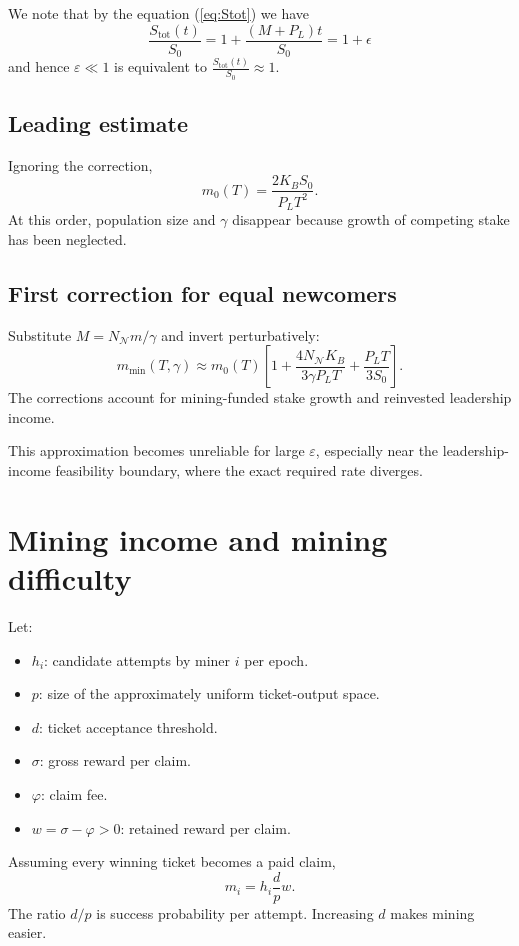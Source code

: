 \documentclass[11pt,a4paper]{article}
\begin{document}
We note that by the equation  (\ref{eq:Stot}) we have 
%
\begin{equation}
\frac{S_{\mathrm{tot}}(t)}{S_0}=1+\frac{(M+P_L)t}{S_0}=1+\epsilon
\end{equation}
%
and hence $\varepsilon\ll1$ is equivalent to $\frac{S_{\mathrm{tot}}(t)}{S_0}\approx1$.


\subsection*{Leading estimate}
Ignoring the correction,
\begin{equation}
\boxed{m_0(T)=\frac{2K_BS_0}{P_LT^2}.}
\end{equation}
At this order, population size and $\gamma$ disappear because growth of competing stake has been neglected.

\subsection*{First correction for equal newcomers}
Substitute $M=N_{\mathcal N}m/\gamma$ and invert perturbatively:
\begin{equation}
\boxed{m_{\min}(T,\gamma)\approx m_0(T)\left[1+\frac{4N_{\mathcal N}K_B}{3\gamma P_LT}+\frac{P_LT}{3S_0}\right].}
\end{equation}
The corrections account for mining-funded stake growth and reinvested leadership income.

This approximation becomes unreliable for large $\varepsilon$, especially near the leadership-income feasibility boundary, where the exact required rate diverges.

\section{Mining income and mining difficulty}\label{sec:difficulty}
Let:
\begin{itemize}
\item $h_i$: candidate attempts by miner $i$ per epoch.
\item $p$: size of the approximately uniform ticket-output space.
\item $d$: ticket acceptance threshold.
\item $\sigma$: gross reward per claim.
\item $\varphi$: claim fee.
\item $w=\sigma-\varphi>0$: retained reward per claim.
\end{itemize}
Assuming every winning ticket becomes a paid claim,
\begin{equation}
\boxed{m_i=h_i\frac{d}{p}w.}
\end{equation}
The ratio $d/p$ is success probability per attempt. Increasing $d$ makes mining easier.
\end{document}
